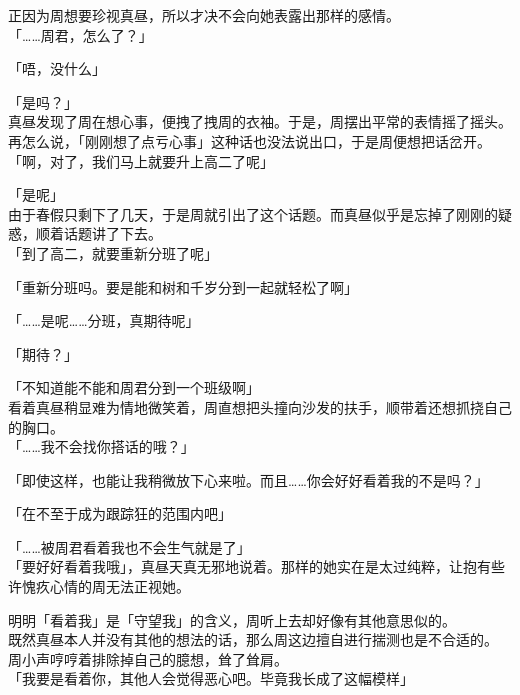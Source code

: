 正因为周想要珍视真昼，所以才决不会向她表露出那样的感情。\\

「……周君，怎么了？」

「唔，没什么」

「是吗？」\\

真昼发现了周在想心事，便拽了拽周的衣袖。于是，周摆出平常的表情摇了摇头。\\

再怎么说，「刚刚想了点亏心事」这种话也没法说出口，于是周便想把话岔开。\\

「啊，对了，我们马上就要升上高二了呢」

「是呢」\\

由于春假只剩下了几天，于是周就引出了这个话题。而真昼似乎是忘掉了刚刚的疑惑，顺着话题讲了下去。\\

「到了高二，就要重新分班了呢」

「重新分班吗。要是能和树和千岁分到一起就轻松了啊」

「……是呢……分班，真期待呢」

「期待？」

「不知道能不能和周君分到一个班级啊」\\

看着真昼稍显难为情地微笑着，周直想把头撞向沙发的扶手，顺带着还想抓挠自己的胸口。\\

「……我不会找你搭话的哦？」

「即使这样，也能让我稍微放下心来啦。而且……你会好好看着我的不是吗？」

「在不至于成为跟踪狂的范围内吧」

「……被周君看着我也不会生气就是了」\\

「要好好看着我哦」，真昼天真无邪地说着。那样的她实在是太过纯粹，让抱有些许愧疚心情的周无法正视她。

明明「看着我」是「守望我」的含义，周听上去却好像有其他意思似的。\\

既然真昼本人并没有其他的想法的话，那么周这边擅自进行揣测也是不合适的。\\

周小声哼哼着排除掉自己的臆想，耸了耸肩。\\

「我要是看着你，其他人会觉得恶心吧。毕竟我长成了这幅模样」\\

